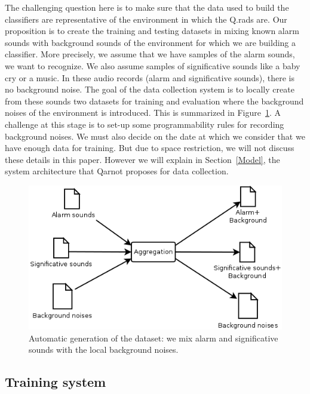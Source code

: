 \documentclass[10pt, conference, compsocconf]{IEEEtran}
\begin{document}
The challenging question here is to make sure that the data used to build the classifiers are representative of the environment 
in which the Q.rads are. Our proposition is to create the training and testing datasets in mixing known alarm sounds with 
background sounds of the environment for which we are building a classifier. More precisely, we assume that we have 
samples of the alarm sounds, we want to recognize. We also assume samples of significative sounds like a baby cry or a music. 
In these audio records (alarm and significative sounds), there is no background noise. The goal of the data collection 
system is to locally create from these sounds two datasets for training and evaluation where 
the background noises of the environment is introduced. This is summarized in Figure~\ref{fig:gen}. 
A challenge at this stage is to set-up some programmability rules for recording background noises. We must also decide on the date at which we consider that we have enough data for training. But due to space restriction, we will not discuss these details in this paper. However we will explain in Section~\ref{Model}, the 
system architecture that Qarnot proposes for data collection.

	\begin{figure}[hbtp]
	\begin{center}
	\includegraphics[scale=0.3]{./Figures/Aggregation.png}
	\caption{Automatic generation of the dataset: we mix alarm and significative sounds with the local background noises.}
	\label{fig:gen}
	\end{center}
	\end{figure}


\subsection{Training system}
\end{document}
